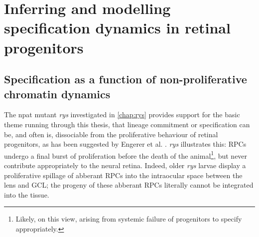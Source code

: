 \chapter{Inferring and modelling specification dynamics in retinal progenitors}
\label{chap:rysoutro}

\section{Specification as a function of non-proliferative chromatin dynamics}
The npat mutant \textit{rys} investigated in \autoref{chap:rys} provides support for the basic theme running through this thesis, that lineage commitment or specification can be, and often is, dissociable from the proliferative behaviour of retinal progenitors, as has been suggested by Engerer et al. \cite{Engerer2017}. \textit{rys} illustrates this: RPCs undergo a final burst of proliferation before the death of the animal\footnote{Likely, on this view, arising from systemic failure of progenitors to specify appropriately.}, but never contribute appropriately to the neural retina. Indeed, older \textit{rys} larvae display a proliferative spillage of abberant RPCs into the intraocular space between the lens and GCL; the progeny of these abberant RPCs literally cannot be integrated into the tissue.

